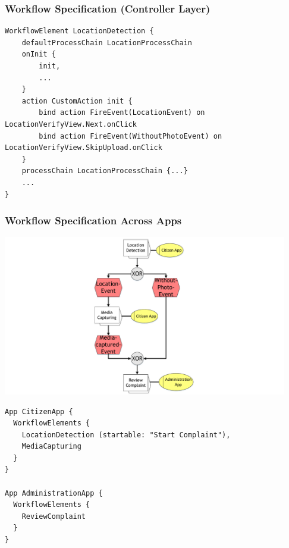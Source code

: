 \begin{frame}[fragile]
 \frametitle{Workflow Specification (Controller Layer)}
 
\begin{lstlisting}[basicstyle=\footnotesize\ttfamily]
WorkflowElement LocationDetection {
    defaultProcessChain LocationProcessChain
    onInit {
        init,
        ...
    }	
    action CustomAction init {
        bind action FireEvent(LocationEvent) on LocationVerifyView.Next.onClick
        bind action FireEvent(WithoutPhotoEvent) on LocationVerifyView.SkipUpload.onClick
    }
    processChain LocationProcessChain {...}
    ...
}
\end{lstlisting}
\end{frame}

\begin{frame}
	\plainnumber
	\frametitle{Workflow Specification Across Apps}
	
	\begin{minipage}{0.45\textwidth}
	    		        \includegraphics[height = 7cm, trim = 10cm 0cm 10cm 0cm, clip = true]{images/wfAcrossApps}	  
	\end{minipage}\hfill
	\begin{minipage}{0.5\textwidth}
\begin{lstlisting}
App CitizenApp {
  WorkflowElements {
    LocationDetection (startable: "Start Complaint"),
    MediaCapturing
  }
}

App AdministrationApp {
  WorkflowElements {
    ReviewComplaint
  }
}
\end{lstlisting}
\end{minipage}

\end{frame}


